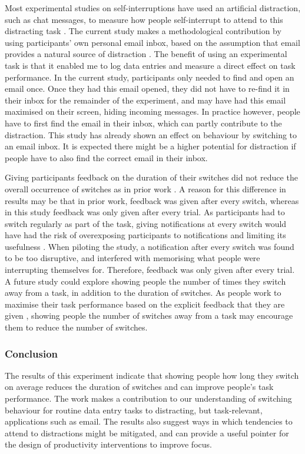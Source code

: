 Most experimental studies on self-interruptions have used an artificial distraction, such as chat messages, to measure how people self-interrupt to attend to this distracting task \citep{Katidioti2013, Salvucci2010}. The current study makes a methodological contribution by using participants' own personal email inbox, based on the assumption that email provides a natural source of distraction \citep{Hanrahan2015, Mark2016}. The benefit of using an experimental task is that it enabled me to log data entries and measure a direct effect on task performance. 
In the current study, participants only needed to find and open an email once. Once they had this email opened, they did not have to re-find it in their inbox for the remainder of the experiment, and may have had this email maximised on their screen, hiding incoming messages. In practice however, people have to first find the email in their inbox, which can partly contribute to the distraction. This study has already shown an effect on behaviour by switching to an email inbox. It is expected there might be a higher potential for distraction if people have to also find the correct email in their inbox.

Giving participants feedback on the duration of their switches did not reduce the overall occurrence of switches as in prior work \citep{Gould2016a}. A reason for this difference in results may be that in prior work, feedback was given after every switch, whereas in this study feedback was only given after every trial. As participants had to switch regularly as part of the task, giving notifications at every switch would have had the risk of overexposing participants to notifications and limiting its usefulness \citep{Cutrell2001, Whittaker2016}. When piloting the study, a notification after every switch was found to be too disruptive, and interfered with memorising what people were interrupting themselves for. Therefore, feedback was only given after every trial. A future study could explore showing people the number of times they switch away from a task, in addition to the duration of switches. As people work to maximise their task performance based on the explicit feedback that they are given \citep{Farmer2017}, showing people the number of switches away from a task may encourage them to reduce the number of switches.

\subsubsection{Conclusion}
The results of this experiment indicate that showing people how long they switch on average reduces the duration of switches and can improve people's task performance. The work makes a contribution to our understanding of switching behaviour for routine data entry tasks to distracting, but task-relevant, applications such as email. The results also suggest ways in which tendencies to attend to distractions might be mitigated, and can provide a useful pointer for the design of productivity interventions to improve focus.

